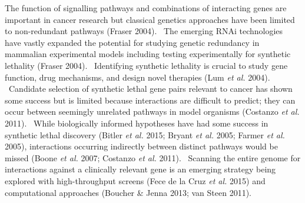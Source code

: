 The function of signalling pathways and combinations of interacting genes are important in cancer research but classical genetics approaches have been limited to non-redundant pathways (Fraser 2004). \ The emerging RNAi technologies have vastly expanded the potential for studying genetic redundancy in mammalian experimental models including testing experimentally for synthetic lethality (Fraser 2004). \ Identifying synthetic lethality is crucial to study gene function, drug mechanisms, and design novel therapies (Lum\textit{ et al.} 2004). \ Candidate selection of synthetic lethal gene pairs relevant to cancer has shown some success but is limited because interactions are difficult to predict; they can occur between seemingly unrelated pathways in model organisms (Costanzo\textit{ et al.} 2011). \ While biologically informed hypotheses have had some success in synthetic lethal discovery (Bitler\textit{ et al.} 2015; Bryant\textit{ et al.} 2005; Farmer\textit{ et al.} 2005), interactions occurring indirectly between distinct pathways would be missed (Boone\textit{ et al.} 2007; Costanzo\textit{ et al.} 2011). \ Scanning the entire genome for interactions against a clinically relevant gene is an emerging strategy being explored with high-throughput screens (Fece de la Cruz\textit{ et al.} 2015) and computational approaches (Boucher \& Jenna 2013; van Steen 2011). \  

